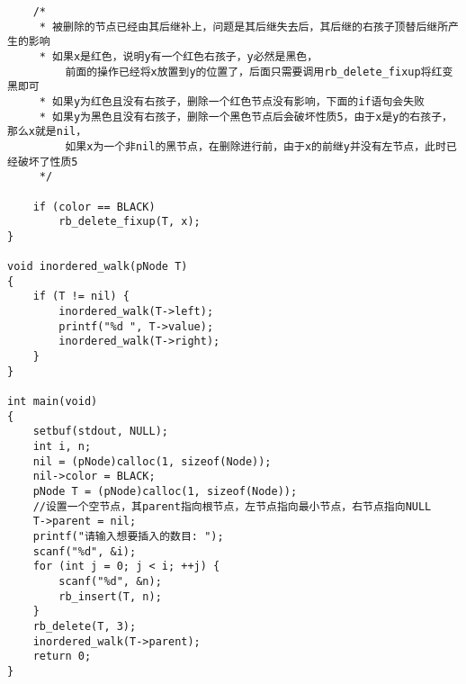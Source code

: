 \begin{verbatim}
    /*
     * 被删除的节点已经由其后继补上，问题是其后继失去后，其后继的右孩子顶替后继所产生的影响
     * 如果x是红色，说明y有一个红色右孩子，y必然是黑色，
         前面的操作已经将x放置到y的位置了，后面只需要调用rb_delete_fixup将红变黑即可
     * 如果y为红色且没有右孩子，删除一个红色节点没有影响，下面的if语句会失败
     * 如果y为黑色且没有右孩子，删除一个黑色节点后会破坏性质5，由于x是y的右孩子，那么x就是nil，
         如果x为一个非nil的黑节点，在删除进行前，由于x的前继y并没有左节点，此时已经破坏了性质5
     */

    if (color == BLACK)
        rb_delete_fixup(T, x);
}

void inordered_walk(pNode T)
{
    if (T != nil) {
        inordered_walk(T->left);
        printf("%d ", T->value);
        inordered_walk(T->right);
    }
}

int main(void)
{
    setbuf(stdout, NULL);
    int i, n;
    nil = (pNode)calloc(1, sizeof(Node));
    nil->color = BLACK;
    pNode T = (pNode)calloc(1, sizeof(Node)); 
    //设置一个空节点，其parent指向根节点，左节点指向最小节点，右节点指向NULL
    T->parent = nil;
    printf("请输入想要插入的数目: ");
    scanf("%d", &i);
    for (int j = 0; j < i; ++j) {
        scanf("%d", &n);
        rb_insert(T, n);
    }
    rb_delete(T, 3);
    inordered_walk(T->parent);
    return 0;
}
\end{verbatim}
